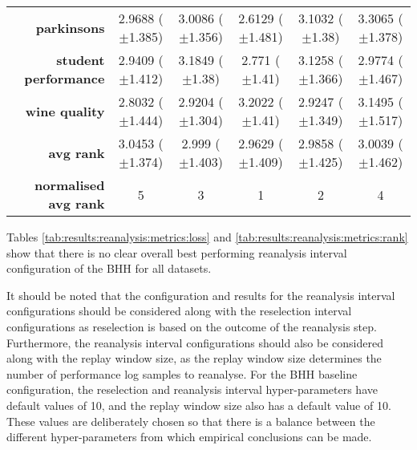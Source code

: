 \begin{table}[htb]
{\begin{tabular}{r|ccccc}
                  \textbf{parkinsons}          & \cellcolor[rgb]{ .937,  .902,  .514}2.9688 ($\pm$1.385) & \cellcolor[rgb]{ 1,  .922,  .518}3.0086 ($\pm$1.356)    & \cellcolor[rgb]{ .388,  .745,  .482}2.6129 ($\pm$1.481) & \cellcolor[rgb]{ .992,  .761,  .49}3.1032 ($\pm$1.38)   & \cellcolor[rgb]{ .973,  .412,  .42}3.3065 ($\pm$1.378)  \\
                  \textbf{student performance} & \cellcolor[rgb]{ .89,  .89,  .51}2.9409 ($\pm$1.412)    & \cellcolor[rgb]{ .973,  .412,  .42}3.1849 ($\pm$1.38)   & \cellcolor[rgb]{ .388,  .745,  .482}2.771 ($\pm$1.41)   & \cellcolor[rgb]{ .98,  .561,  .451}3.1258 ($\pm$1.366)  & \cellcolor[rgb]{ 1,  .922,  .518}2.9774 ($\pm$1.467)    \\
                  \textbf{wine quality}        & \cellcolor[rgb]{ .388,  .745,  .482}2.8032 ($\pm$1.444) & \cellcolor[rgb]{ .976,  .914,  .514}2.9204 ($\pm$1.304) & \cellcolor[rgb]{ .973,  .412,  .42}3.2022 ($\pm$1.41)   & \cellcolor[rgb]{ 1,  .922,  .518}2.9247 ($\pm$1.349)    & \cellcolor[rgb]{ .98,  .51,  .439}3.1495 ($\pm$1.517)   \\
                  \midrule
                  \textbf{avg rank}            & \cellcolor[rgb]{ .973,  .412,  .42}3.0453 ($\pm$1.374)  & \cellcolor[rgb]{ 1,  .922,  .518}2.999 ($\pm$1.403)     & \cellcolor[rgb]{ .388,  .745,  .482}2.9629 ($\pm$1.409) & \cellcolor[rgb]{ .773,  .855,  .502}2.9858 ($\pm$1.425) & \cellcolor[rgb]{ 1,  .871,  .51}3.0039 ($\pm$1.462)     \\
                  \midrule
                  \textbf{normalised avg rank} & \cellcolor[rgb]{ .973,  .412,  .42}5                    & \cellcolor[rgb]{ 1,  .922,  .518}3                      & \cellcolor[rgb]{ .388,  .745,  .482}1                   & \cellcolor[rgb]{ .694,  .831,  .498}2                   & \cellcolor[rgb]{ .988,  .667,  .471}4                   \\
            \end{tabular}%
      }
\end{table}%


Tables \ref{tab:results:reanalysis:metrics:loss} and \ref{tab:results:reanalysis:metrics:rank} show that there is no clear overall best performing reanalysis interval configuration of the \acs{BHH} for all datasets.

It should be noted that the configuration and results for the reanalysis interval configurations should be considered along with the reselection interval configurations as reselection is based on the outcome of the reanalysis step. Furthermore, the reanalysis interval configurations should also be considered along with the replay window size, as the replay window size determines the number of performance log samples to reanalyse. For the \acs{BHH} baseline configuration, the reselection and reanalysis interval hyper-parameters have default values of 10, and the replay window size also has a default value of 10. These values are deliberately chosen so that there is a balance between the different hyper-parameters from which empirical conclusions can be made.


